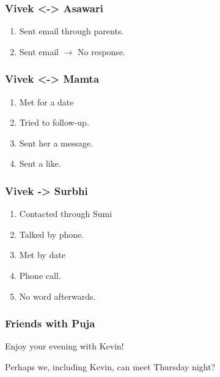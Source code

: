 \begin{frame}
\frametitle {   Vivek <-> Asawari } 

\begin{enumerate} 
\tiny \item \tiny Sent email through parents. 
\item \tiny Sent email $\rightarrow$ No response. 

\end{enumerate} 

\end{frame} 




\begin{frame}[label=relMamta]
\frametitle{Vivek <-> Mamta} 
\begin{enumerate} 
\tiny \item \tiny Met for a date 
\item \tiny Tried to follow-up. 
\item \tiny Sent her a message. 
\item \tiny Sent a like. 
\end{enumerate} 
\end{frame} 

\begin{frame} 
\frametitle{ Vivek ->  Surbhi} 
\begin{enumerate} 

\item \tiny Contacted through Sumi 

\item \tiny Talked by phone. 

\item \tiny Met by date 

\item \tiny Phone call. 

\item \tiny No word afterwards.

\end{enumerate} 

\end{frame} 

\begin{frame}[label=pujaFriends]
\frametitle{ Friends with Puja} 

Enjoy your evening with Kevin! 

Perhaps we, including Kevin, can meet Thursday night?

\end{frame} 

